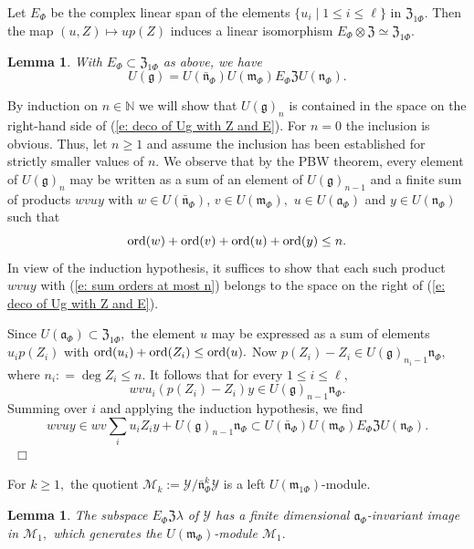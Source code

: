 \documentclass[12pt,a4paper]{article}
\newtheorem{Lemma}[Thm]{Lemma}
\newenvironment{lemma}[0]{\begin{Lemma}\noindent}%
{\end{Lemma}}
\def\proof{\par\noindent{\it Proof.}{\ }{\ }}
\def\qed{~\hfill\hbox{$\Box$}\medbreak}
\def\msy#1{{\mathbb #1}}
\def\N{{\msy N}}
\def\gl{\lambda}
\def\got#1{\mathfrak #1}
\def\fa{{\got a}}
\def\fg{{\got g}}
\def\fm{{\got m}}
\def\fn{{\got n}}
\def\cM{{\mathcal M}}
\def\cY{{\mathcal Y}}
\numberwithin{Thm}{section}
\numberwithin{equation}{section}
\def\bfn{\bar\fn}
\def\fZ{{\mathfrak Z}}
\numberwithin{equation}{section}
\def\fZ{{\mathfrak Z}}
\def\bfn{{\bar \fn}}
\def\ord{{\rm ord}}
\begin{document}
Let $E_\Phi $ be the complex linear
span of the elements $\{u_i\mid 1\leq i \leq \ell\}$ in $\fZ_{1\Phi}.$ Then 
the map $(u, Z)\mapsto  u p(Z)$ induces a linear isomorphism
$E_\Phi\otimes \fZ \simeq \fZ_{1\Phi}. $
\begin{lemma}
With $E_\Phi \subset \fZ_{1\Phi}$ as above, we have   
\begin{equation}
\label{e: deco of Ug with Z and E}
U(\fg) = U(\bfn_\Phi) U(\fm_\Phi) E_\Phi \fZ U(\fn_\Phi).
\end{equation} 
\end{lemma}

\proof 
By induction on $n \in \N$ we will show that $U(\fg)_n$ is contained in 
the space on the right-hand side of (\ref{e: deco of Ug with Z and E}). 
For $n=0$ the inclusion is obvious. Thus, let $n \geq 1$ and assume the inclusion
has been established for strictly smaller values of $n.$   
We observe that by the PBW theorem, every element of $U(\fg)_n$ may be written
as a sum of an element of $U(\fg)_{n-1}$ and a finite sum of products 
$w v u y $ with $w \in U(\bfn_\Phi)$, $v \in U(\fm_\Phi),$ $ u \in  U(\fa_\Phi)$ 
and $y \in U(\fn_\Phi)$ such that 
\begin{equation}
\label{e: sum orders at most n}
\ord (w) + \ord (v) + \ord (u) + \ord (y) \leq n.
\end{equation}
In view of the induction hypothesis, it suffices to 
show that each such product $wvuy$ with (\ref{e: sum orders at most n})
belongs to the space on the right of 
(\ref{e: deco of Ug with Z and E}). 

Since  $U(\fa_{\Phi})\subset \fZ_{1\Phi},$ the element $u$ may be
expressed as a sum of elements $u_i p(Z_i)$ with $\ord(u_i) + \ord(Z_i) \leq
\ord (u).$ Now $p(Z_i) - Z_i \in U(\fg)_{n_i -1}\fn_{\Phi},$ where 
$n_i: = \deg Z_i \leq n.$ It follows that for every $1 \leq i \leq \ell,$ 
$$
wvu_i (p(Z_i) - Z_i )y \in U(\fg)_{n-1}\fn_\Phi.
$$%
Summing over $i$ and applying the induction hypothesis, we find
$$ 
wvu y \in w v \sum_{i} u_i Z_i y + U(\fg)_{n -1} \fn_\Phi \subset U(\bfn_\Phi) U(\fm_\Phi) E_\Phi \fZ U(\fn_\Phi). 
$$%
\qed

For $k \geq 1,$ the quotient $\cM_k:= \cY/\bfn_\Phi^k \cY$ is a 
left $U(\fm_{1\Phi})$-module. 

\begin{lemma}
The subspace $E_\Phi \fZ \gl$ of $\cY$ has a finite dimensional 
$\fa_\Phi$-invariant image in $\cM_1,$ which generates the $U(\fm_{\Phi})$-module $\cM_1.$ 
\end{lemma}
\end{document}
